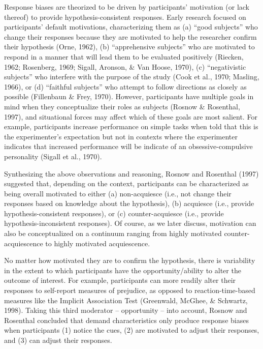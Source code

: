 \documentclass[
  man,floatsintext]{apa6}
\begin{document}
Response biases are theorized to be driven by participants' motivation (or lack thereof) to provide hypothesis-consistent responses. Early research focused on participants' default motivations, characterizing them as (a) ``good subjects'' who change their responses because they are motivated to help the researcher confirm their hypothesis (Orne, 1962), (b) ``apprehensive subjects'' who are motivated to respond in a manner that will lead them to be evaluated positively (Riecken, 1962; Rosenberg, 1969; Sigall, Aronson, \& Van Hoose, 1970), (c) ``negativistic subjects'' who interfere with the purpose of the study (Cook et al., 1970; Masling, 1966), or (d) ``faithful subjects'' who attempt to follow directions as closely as possible (Fillenbaun \& Frey, 1970). However, participants have multiple goals in mind when they conceptualize their roles as subjects (Rosnow \& Rosenthal, 1997), and situational forces may affect which of these goals are most salient. For example, participants increase performance on simple tasks when told that this is the experimenter's expectation but not in contexts where the experimenter indicates that increased performance will be indicate of an obsessive-compulsive personality (Sigall et al., 1970).

Synthesizing the above observations and reasoning, Rosnow and Rosenthal (1997) suggested that, depending on the context, participants can be characterized as being overall motivated to either (a) non-acquiesce (i.e., not change their responses based on knowledge about the hypothesis), (b) acquiesce (i.e., provide hypothesis-consistent responses), or (c) counter-acquiesce (i.e., provide hypothesis-inconsistent responses). Of course, as we later discuss, motivation can also be conceptualized on a continuum ranging from highly motivated counter-acquiescence to highly motivated acquiescence.

No matter how motivated they are to confirm the hypothesis, there is variability in the extent to which participants have the opportunity/ability to alter the outcome of interest. For example, participants can more readily alter their responses to self-report measures of prejudice, as opposed to reaction-time-based measures like the Implicit Association Test (Greenwald, McGhee, \& Schwartz, 1998). Taking this third moderator -- opportunity -- into account, Rosnow and Rosenthal concluded that demand characteristics only produce response biases when participants (1) notice the cues, (2) are motivated to adjust their responses, and (3) can adjust their responses.
\end{document}
